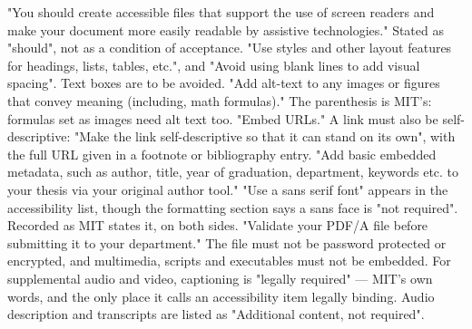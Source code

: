 %
%
	{"You should create accessible files that support the use of screen readers
	 and make your document more easily readable by assistive technologies."
	 Stated as "should", not as a condition of acceptance.}
	{"Use styles and other layout features for headings, lists, tables, etc.",
	 and "Avoid using blank lines to add visual spacing". Text boxes are to be
	 avoided.}
	{"Add alt-text to any images or figures that convey meaning (including,
	 math formulas)." The parenthesis is MIT's: formulas set as images need
	 alt text too.}
	{"Embed URLs." A link must also be self-descriptive: "Make the link
	 self-descriptive so that it can stand on its own", with the full URL given
	 in a footnote or bibliography entry.}
	{"Add basic embedded metadata, such as author, title, year of graduation,
	 department, keywords etc. to your thesis via your original author tool."}
	{"Use a sans serif font" appears in the accessibility list, though the
	 formatting section says a sans face is "not required". Recorded as MIT
	 states it, on both sides.}
	{"Validate your PDF/A file before submitting it to your department." The
	 file must not be password protected or encrypted, and multimedia,
	 scripts and executables must not be embedded.}
	{For supplemental audio and video, captioning is "legally required" —
	 MIT's own words, and the only place it calls an accessibility item
	 legally binding. Audio description and transcripts are listed as
	 "Additional content, not required".}

